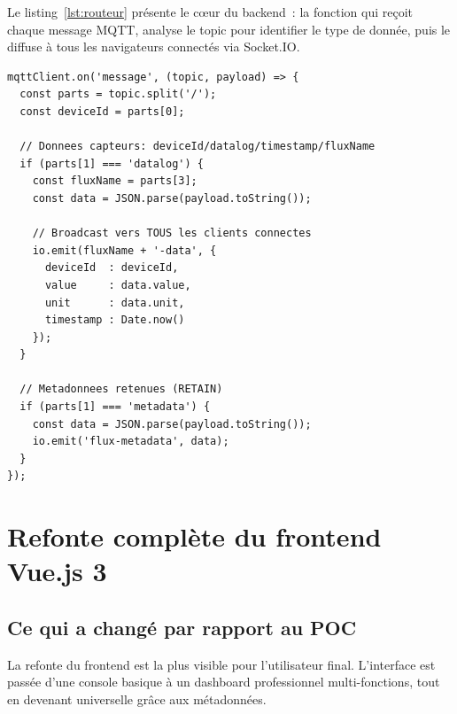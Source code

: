 \documentclass[12pt, a4paper]{report}
\begin{document}
Le listing~\ref{lst:routeur} pr\'esente le c{\oe}ur du backend~:
la fonction qui re\c{c}oit chaque message MQTT, analyse le topic
pour identifier le type de donn\'ee, puis le diffuse \`a tous les
navigateurs connect\'es via Socket.IO.

\begin{lstlisting}[caption={Routeur MQTT vers Socket.IO -- Coeur du
                   backend}, label={lst:routeur}]
mqttClient.on('message', (topic, payload) => {
  const parts = topic.split('/');
  const deviceId = parts[0];

  // Donnees capteurs: deviceId/datalog/timestamp/fluxName
  if (parts[1] === 'datalog') {
    const fluxName = parts[3];
    const data = JSON.parse(payload.toString());

    // Broadcast vers TOUS les clients connectes
    io.emit(fluxName + '-data', {
      deviceId  : deviceId,
      value     : data.value,
      unit      : data.unit,
      timestamp : Date.now()
    });
  }

  // Metadonnees retenues (RETAIN)
  if (parts[1] === 'metadata') {
    const data = JSON.parse(payload.toString());
    io.emit('flux-metadata', data);
  }
});
\end{lstlisting}

\chapter{Refonte compl\`ete du frontend Vue.js 3}

\section{Ce qui a chang\'e par rapport au POC}

La refonte du frontend est la plus visible pour l'utilisateur final.
L'interface est pass\'ee d'une console basique \`a un dashboard
professionnel multi-fonctions, tout en devenant universelle gr\^ace
aux m\'etadonn\'ees.
\end{document}
